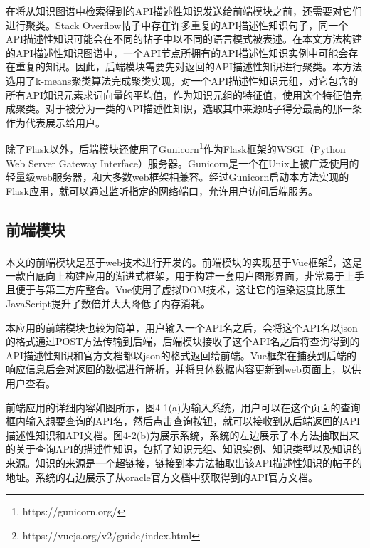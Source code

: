 在将从知识图谱中检索得到的API描述性知识发送给前端模块之前，还需要对它们进行聚类。Stack Overflow帖子中存在许多重复的API描述性知识句子，同一个API描述性知识可能会在不同的帖子中以不同的语言模式被表述。在本文方法构建的API描述性知识图谱中，一个API节点所拥有的API描述性知识实例中可能会存在重复的知识。因此，后端模块需要先对返回的API描述性知识进行聚类。本方法选用了k-means聚类算法完成聚类实现，对一个API描述性知识元组，对它包含的所有API知识元素求词向量的平均值，作为知识元组的特征值，使用这个特征值完成聚类。对于被分为一类的API描述性知识，选取其中来源帖子得分最高的那一条作为代表展示给用户。

除了Flask以外，后端模块还使用了Gunicorn\footnote{https://gunicorn.org/}作为Flask框架的WSGI（Python Web Server Gateway Interface）服务器。Gunicorn是一个在Unix上被广泛使用的轻量级web服务器，和大多数web框架相兼容。经过Gunicorn启动本方法实现的Flask应用，就可以通过监听指定的网络端口，允许用户访问后端服务。

\subsection{前端模块}
本文的前端模块是基于web技术进行开发的。前端模块的实现基于Vue框架\footnote{https://vuejs.org/v2/guide/index.html}，这是一款自底向上构建应用的渐进式框架，用于构建一套用户图形界面，非常易于上手且便于与第三方库整合。Vue使用了虚拟DOM技术，这让它的渲染速度比原生JavaScript提升了数倍并大大降低了内存消耗。

本应用的前端模块也较为简单，用户输入一个API名之后，会将这个API名以json的格式通过POST方法传输到后端，后端模块接收了这个API名之后将查询得到的API描述性知识和官方文档都以json的格式返回给前端。Vue框架在捕获到后端的响应信息后会对返回的数据进行解析，并将具体数据内容更新到web页面上，以供用户查看。

前端应用的详细内容如图所示，图4-1(a)为输入系统，用户可以在这个页面的查询框内输入想要查询的API名，然后点击查询按钮，就可以接收到从后端返回的API描述性知识和API文档。图4-2(b)为展示系统，系统的左边展示了本方法抽取出来的关于查询API的描述性知识，包括了知识元组、知识实例、知识类型以及知识的来源。知识的来源是一个超链接，链接到本方法抽取出该API描述性知识的帖子的地址。系统的右边展示了从oracle官方文档中获取得到的API官方文档。

